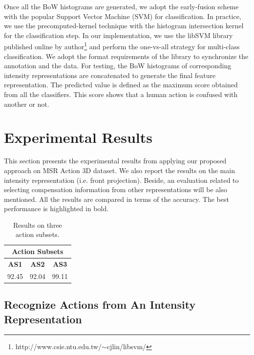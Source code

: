 \documentclass[review]{elsarticle}
\begin{document}
Once all the BoW histograms are generated, we adopt the early-fusion scheme with the popular Support Vector Machine (SVM) for classification. In practice, we use the precomputed-kernel technique with the histogram intersection kernel for the classification step. In our implementation, we use the libSVM library published online by author\footnote{http://www.csie.ntu.edu.tw/$\sim$cjlin/libsvm/} and perform the one-vs-all strategy for multi-class classification. We adopt the format requirements of the library to synchronize the annotation and the data. For testing, the BoW histograms of corresponding intensity representations are concatenated to generate the final feature representation. The predicted value is defined as the maximum score obtained from all the classifiers. This score shows that a human action is confused with another or not.

\section{Experimental Results}
\label{lbl:ExperimentalResults}
This section presents the experimental results from applying our proposed approach on MSR Action 3D dataset. We also report the results on the main intensity representation (i.e. front projection). Beside, an evaluation related to selecting compensation information from other representations will be also mentioned. All the results are compared in terms of the accuracy. The best performance is highlighted in bold.

\begin{table}
	\begin{center}
		\begin{tabular}{ccc}
		
		       \multicolumn{ 3}{c}{{\bf Action Subsets}} \\
		\hline
		     {\bf AS1} &      {\bf AS2} &      {\bf AS3} \\
		\hline
		        92.45  &         92.04  &         99.11  \\
		
		\end{tabular}
	\end{center}
	\caption{\label{lbl:MBHandAS123}Results on three action subsets.}
\end{table}

\subsection{Recognize Actions from An Intensity Representation}
\end{document}
